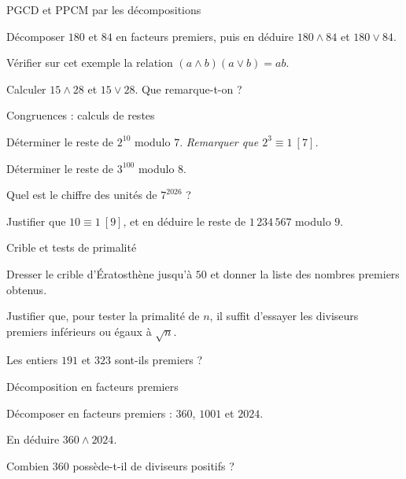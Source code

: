 \begin{exercice}[1]{PGCD et PPCM par les décompositions}
\begin{questions}
  \item Décomposer $180$ et $84$ en facteurs premiers, puis en déduire
    $180\wedge84$ et $180\vee84$.
  \item Vérifier sur cet exemple la relation
    $(a\wedge b)(a\vee b)=ab$.
  \item Calculer $15\wedge28$ et $15\vee28$. Que remarque-t-on ?
\end{questions}
\end{exercice}

\begin{exercice}[1]{Congruences : calculs de restes}
\begin{questions}
  \item Déterminer le reste de $2^{10}$ modulo $7$.
    \emph{Remarquer que $2^{3}\equiv1\ [7]$.}
  \item Déterminer le reste de $3^{100}$ modulo $8$.
  \item Quel est le chiffre des unités de $7^{2026}$ ?
  \item Justifier que $10\equiv1\ [9]$, et en déduire le reste de
    $1\,234\,567$ modulo $9$.
\end{questions}
\end{exercice}

\begin{exercice}[1]{Crible et tests de primalité}
\begin{questions}
  \item Dresser le crible d'Ératosthène jusqu'à $50$ et donner la liste des
    nombres premiers obtenus.
  \item Justifier que, pour tester la primalité de $n$, il suffit d'essayer
    les diviseurs premiers inférieurs ou égaux à $\sqrt n$.
  \item Les entiers $191$ et $323$ sont-ils premiers ?
\end{questions}
\end{exercice}

\begin{exercice}[1]{Décomposition en facteurs premiers}
\begin{questions}
  \item Décomposer en facteurs premiers : $360$, $1001$ et $2024$.
  \item En déduire $360\wedge2024$.
  \item Combien $360$ possède-t-il de diviseurs positifs ?
\end{questions}
\end{exercice}

